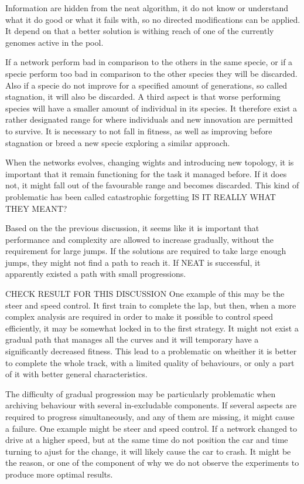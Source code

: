 Information are hidden from the neat algorithm, it do not know or understand what it do good or what it fails with, so no directed modifications can be applied. It depend on that a better solution is withing reach of one of the currently genomes active in the pool.

If a network perform bad in comparison to the others in the same specie, or if a specie perform too bad in comparison to the other species they will be discarded\cite{stanley:neat}. Also if a specie do not improve for a specified amount of generations, so called stagnation, it will also be discarded. A third aspect is that worse performing species will have a smaller amount of individual in its species. It therefore exist a rather designated range for where individuals and new innovation are permitted to survive. It is necessary to not fall in fitness, as well as improving before stagnation or breed a new specie exploring a similar approach.

When the networks evolves, changing wights and introducing new topology, it is important that it remain functioning for the task it managed before. If it does not, it might fall out of the favourable range and becomes discarded. This kind of problematic has been called catastrophic forgetting\cite{gomez:CoSyNE} IS IT REALLY WHAT THEY MEANT?

Based on the the previous discussion, it seems like it is important that performance and complexity are allowed to increase gradually, without the requirement for large jumps. If the solutions are required to take large enough jumps, they might not find a path to reach it. If NEAT is successful, it apparently existed a path with small progressions.

CHECK RESULT FOR THIS DISCUSSION One example of this may be the steer and speed control. It first train to complete the lap, but then, when a more complex analysis are required in order to make it possible to control speed efficiently, it may be somewhat locked in to the first strategy. It might not exist a gradual path that manages all the curves and it will temporary have a significantly decreased fitness. This lead to a problematic on wheither it is better to complete the whole track, with a limited quality of behaviours, or only a part of it with better general characteristics.

The difficulty of gradual progression may be particularly problematic when archiving behaviour with several in-excludable components. If several aspects are required to progress simultaneously, and any of them are missing, it might cause a failure. One example might be steer and speed control. If a network changed to drive at a higher speed, but at the same time do not position the car and time turning to ajust for the change, it will likely cause the car to crash. It might be the reason, or one of the component of why we do not observe the experiments to produce more optimal results.

